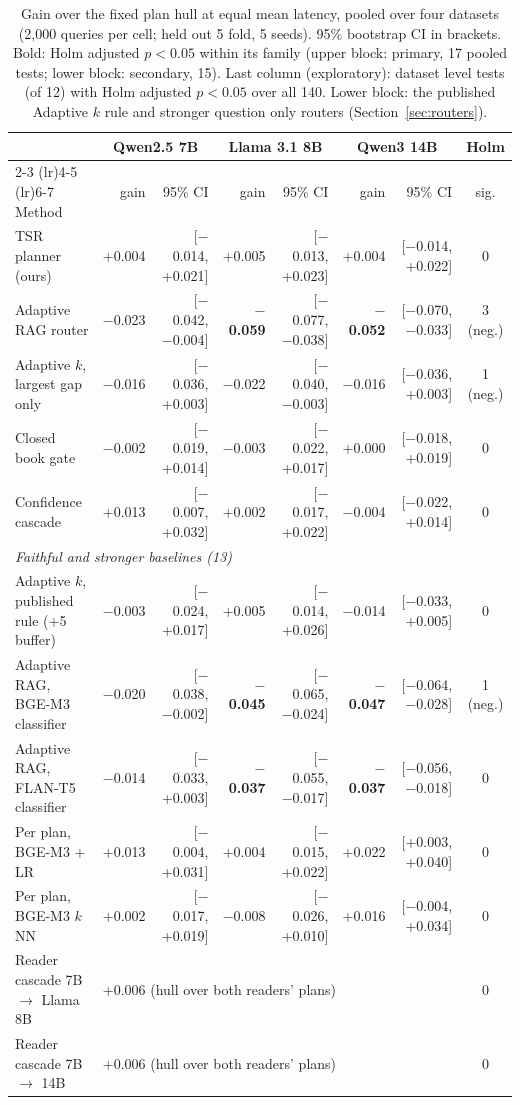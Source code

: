 \begin{table}[t]
\centering
\caption{Gain over the fixed plan hull at equal mean latency, pooled over four datasets (2{,}000 queries per cell; held out 5 fold, 5 seeds). 95\% bootstrap CI in brackets. Bold: Holm adjusted $p<0.05$ within its family (upper block: primary, 17 pooled tests; lower block: secondary, 15). Last column (exploratory): dataset level tests (of 12) with Holm adjusted $p<0.05$ over all 140. Lower block: the published Adaptive $k$ rule and stronger question only routers (Section~\ref{sec:routers}).}
\label{tab:main}
\small
\begin{tabular}{lrrrrrrc}
\toprule
 & \multicolumn{2}{c}{Qwen2.5 7B} & \multicolumn{2}{c}{Llama 3.1 8B} & \multicolumn{2}{c}{Qwen3 14B} & Holm \\
\cmidrule(lr){2-3} \cmidrule(lr){4-5} \cmidrule(lr){6-7}
Method & gain & 95\% CI & gain & 95\% CI & gain & 95\% CI & sig. \\
\midrule
TSR planner (ours) & +0.004 & [$-$0.014, +0.021] & +0.005 & [$-$0.013, +0.023] & +0.004 & [$-$0.014, +0.022] & 0 \\
Adaptive RAG router & $-$0.023 & [$-$0.042, $-$0.004] & \textbf{$-$0.059} & [$-$0.077, $-$0.038] & \textbf{$-$0.052} & [$-$0.070, $-$0.033] & 3 (neg.) \\
Adaptive $k$, largest gap only & $-$0.016 & [$-$0.036, +0.003] & $-$0.022 & [$-$0.040, $-$0.003] & $-$0.016 & [$-$0.036, +0.003] & 1 (neg.) \\
Closed book gate & $-$0.002 & [$-$0.019, +0.014] & $-$0.003 & [$-$0.022, +0.017] & +0.000 & [$-$0.018, +0.019] & 0 \\
Confidence cascade & +0.013 & [$-$0.007, +0.032] & +0.002 & [$-$0.017, +0.022] & $-$0.004 & [$-$0.022, +0.014] & 0 \\
\midrule
\multicolumn{8}{l}{\emph{Faithful and stronger baselines (13)}} \\
Adaptive $k$, published rule (+5 buffer) & $-$0.003 & [$-$0.024, +0.017] & +0.005 & [$-$0.014, +0.026] & $-$0.014 & [$-$0.033, +0.005] & 0 \\
Adaptive RAG, BGE-M3 classifier & $-$0.020 & [$-$0.038, $-$0.002] & \textbf{$-$0.045} & [$-$0.065, $-$0.024] & \textbf{$-$0.047} & [$-$0.064, $-$0.028] & 1 (neg.) \\
Adaptive RAG, FLAN-T5 classifier & $-$0.014 & [$-$0.033, +0.003] & \textbf{$-$0.037} & [$-$0.055, $-$0.017] & \textbf{$-$0.037} & [$-$0.056, $-$0.018] & 0 \\
Per plan, BGE-M3 + LR & +0.013 & [$-$0.004, +0.031] & +0.004 & [$-$0.015, +0.022] & +0.022 & [+0.003, +0.040] & 0 \\
Per plan, BGE-M3 $k$NN & +0.002 & [$-$0.017, +0.019] & $-$0.008 & [$-$0.026, +0.010] & +0.016 & [$-$0.004, +0.034] & 0 \\
\midrule
Reader cascade 7B $\rightarrow$ Llama 8B & \multicolumn{6}{l}{+0.006 \; [$-$0.012, +0.024] (hull over both readers' plans)} & 0 \\
Reader cascade 7B $\rightarrow$ 14B & \multicolumn{6}{l}{+0.006 \; [$-$0.012, +0.024] (hull over both readers' plans)} & 0 \\
\bottomrule
\end{tabular}
\end{table}